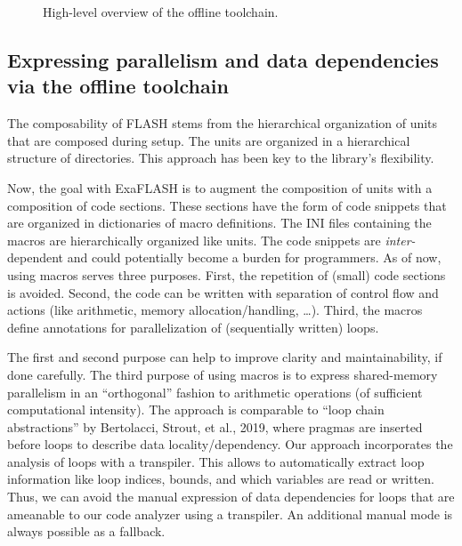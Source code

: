\documentclass{article}
\newcommand{\FlashOfTheFuture}{ExaFLASH\xspace}
\begin{document}
\begin{figure}
  \caption{High-level overview of the offline toolchain.}
  \label{fig:high-level-offline-toolchain}
\end{figure}


\subsection{Expressing parallelism and data dependencies via the offline toolchain}
\label{sec:expressing-parallelism-and-data-dependencies}

The composability of FLASH stems from the hierarchical organization of
units that are composed during setup.  The units are organized in a
hierarchical structure of directories.  This approach has been key to the
library's flexibility.

Now, the goal with \FlashOfTheFuture is to augment the composition of units
with a composition of code sections.  These sections have the form of code
snippets that are organized in dictionaries of macro definitions.  The INI
files containing the macros are hierarchically organized like units.  The code
snippets are \emph{inter-}dependent and could potentially become a burden for
programmers.  As of now, using macros serves three purposes.  First, the
repetition of (small) code sections is avoided.  Second, the code can be
written with separation of control flow and actions (like arithmetic, memory
allocation/handling, \ldots).  Third, the macros define annotations for
parallelization of (sequentially written) loops.

The first and second purpose can help to improve clarity and maintainability,
if done carefully.  The third purpose of using macros is to express
shared-memory parallelism in an ``orthogonal'' fashion to arithmetic operations
(of sufficient computational intensity).  The approach is comparable to ``loop
chain abstractions'' by Bertolacci, Strout, et al., 2019, where pragmas are
inserted before loops to describe data locality/dependency.  Our approach
incorporates the analysis of loops with a transpiler.  This allows to
automatically extract loop information like loop indices, bounds, and which
variables are read or written.  Thus, we can avoid the manual expression of
data dependencies for loops that are ameanable to our code analyzer using a
transpiler.  An additional manual mode is always possible as a fallback.
\end{document}
